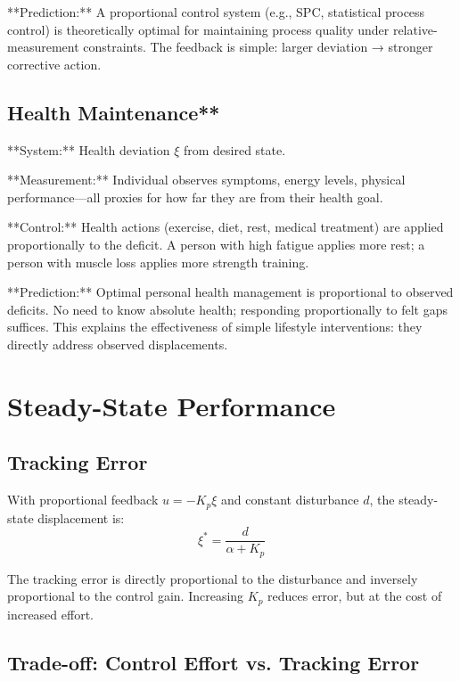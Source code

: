 \documentclass[12pt]{article}
\begin{document}
**Prediction:** A proportional control system (e.g., SPC, statistical process control) is theoretically optimal for maintaining process quality under relative-measurement constraints. The feedback is simple: larger deviation → stronger corrective action.

\subsection{Health Maintenance**}

**System:** Health deviation $\xi$ from desired state.

**Measurement:** Individual observes symptoms, energy levels, physical performance—all proxies for how far they are from their health goal.

**Control:** Health actions (exercise, diet, rest, medical treatment) are applied proportionally to the deficit. A person with high fatigue applies more rest; a person with muscle loss applies more strength training.

**Prediction:** Optimal personal health management is proportional to observed deficits. No need to know absolute health; responding proportionally to felt gaps suffices. This explains the effectiveness of simple lifestyle interventions: they directly address observed displacements.

\section{Steady-State Performance}

\subsection{Tracking Error}

With proportional feedback $u = -K_p \xi$ and constant disturbance $d$, the steady-state displacement is:
\begin{equation}
\xi^* = \frac{d}{\alpha + K_p}
\end{equation}

The tracking error is directly proportional to the disturbance and inversely proportional to the control gain. Increasing $K_p$ reduces error, but at the cost of increased effort.

\subsection{Trade-off: Control Effort vs. Tracking Error}
\end{document}
